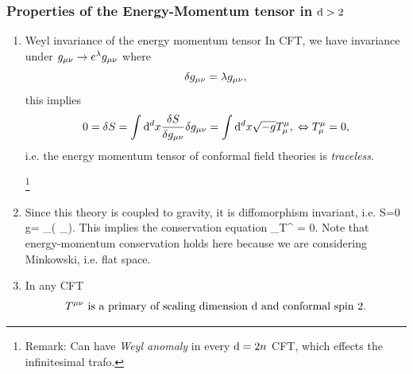 \subsubsection{Properties of the Energy-Momentum tensor in $\mathrm{d}>2$}
\begin{enumerate}
	\item \begin{mybox}{Weyl invariance of the energy momentum tensor}
		In CFT, we have invariance under $g_{\mu \nu}\rightarrow e^\lambda g_{\mu \nu}$ where
		\begin{equation}
		\delta g_{\mu \nu} = \lambda g_{\mu \nu},
		\end{equation}
		this implies
		\begin{equation}
		0= \delta S = \int \mathrm{d}^d x \frac{\delta S}{\delta g_{\mu \nu}}\delta g_{\mu \nu} = \int \mathrm{d}^d x \sqrt{-g} T^\mu_\mu, \; \Leftrightarrow T^\mu_\mu =0,
		\end{equation}
		i.e. the energy momentum tensor of conformal field theories is \emph{traceless}.
	\end{mybox}\footnote{Remark: Can have \emph{Weyl anomaly} in every $\mathrm{d} =2n$ CFT, which effects the infinitesimal trafo.}
\item Since this theory is coupled to gravity, it is diffomorphism invariant, i.e.
\be 
\label{eq:cftDiffeomorphismInvariance}
\delta S=0  \delta g\munu= \partial_{(\mu} \xi_{\nu)}.
\ee 
This implies the conservation equation
\be 
\partial_\mu T^{\mu \nu} = 0.
\ee 
Note that energy-momentum conservation holds here because we are considering Minkowski, i.e. flat space.
\item 
\begin{mybox}{}
	In any CFT
	\begin{equation}
	T^{\mu \nu} \text{ is a primary of scaling dimension $\mathrm{d}$ and conformal spin }2.
	\end{equation}
\end{mybox}
\end{enumerate}

